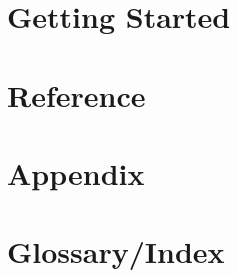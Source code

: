 \documentclass[wordperfect,binder]{initech-manual}
\begin{document}
\FrontMatterFolios
\MakeTitlePage

\tableofcontents
\cleardoublepage
\setcounter{page}{1}\gdef{}
\DividerLeaf
\chapter{Getting Started}



\DividerLeaf
\chapter{Reference}

















\DividerLeaf
\chapter{Appendix}

\DividerLeaf
\chapter{Glossary/Index}

\printindex
\FinishBook[3]
\end{document}
